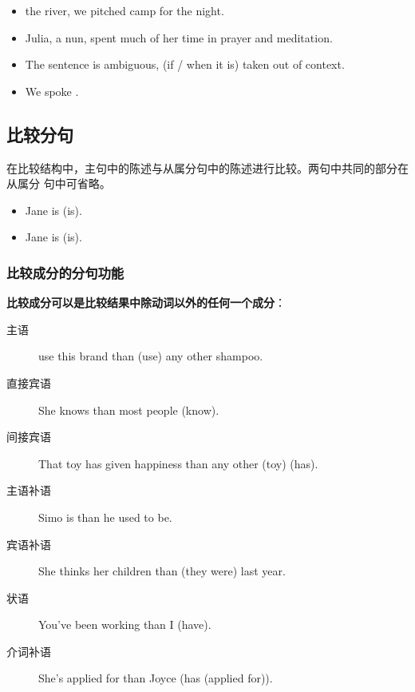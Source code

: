 \begin{itemize}
\item {} the river, we pitched camp for the night.
\item Julia,  a nun, spent much of her time in
  prayer and meditation.
\item The sentence is ambiguous, (if / when it is) taken out of context.

\item We spoke .
\end{itemize}

\subsection{比较分句}

在比较结构中，主句中的陈述与从属分句中的陈述进行比较。两句中共同的部分在从属分
句中可省略。
\begin{itemize}
\item Jane is     (is).
\item Jane is    (is).
\end{itemize}

\subsubsection{比较成分的分句功能}

\textbf{比较成分可以是比较结果中除动词以外的任何一个成分}：
\begin{description}
\item[主语]  use this brand than (use) any other shampoo.

\item[直接宾语] She knows  than most people (know).

\item[间接宾语] That toy has given  happiness than any other (toy) (has).

\item[主语补语] Simo is  than he used to be.

\item[宾语补语] She thinks her children  than (they were) last year.
\item[状语] You've been working  than I (have).

\item[介词补语] She's applied for  than Joyce (has (applied for)).
\end{description}

